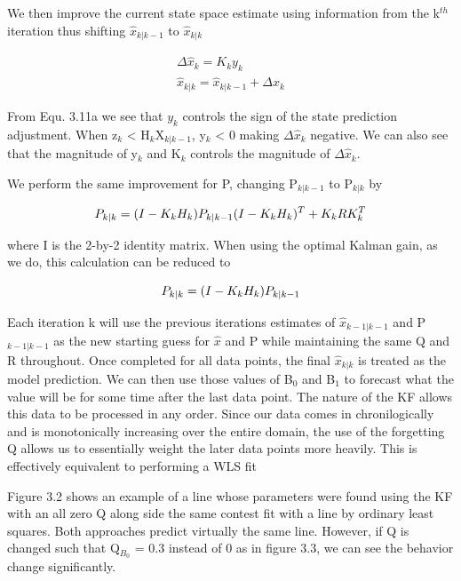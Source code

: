   We then improve the current state space estimate using information from the k$^{th}$ iteration thus shifting $\hat{x}_{k|k-1}$ to $\hat{x}_{k|k}$
  
      \begin{subequations}
      \begin{align}
    \Delta\hat{x}_{k} = K_{k}y_{k} \\
    \hat{x}_{k|k} = \hat{x}_{k|k-1} + \Delta\hat{x}_{k}
    \end{align}
  \end{subequations}

From Equ. 3.11a we see that $y_{k}$ controls the sign of the state prediction adjustment. When z$_{k}$ < H$_{k}$X$_{k|k-1}$, y$_{k}$ < 0 making $\Delta\hat{x}_{k}$ negative. We can also see that the magnitude of y$_{k}$ and K$_{k}$ controls the magnitude of $\Delta\hat{x}_{k}$.

We perform the same improvement for P, changing P$_{k|k-1}$ to P$_{k|k}$ by

\begin{equation} 
\centering
P_{k|k} = (I - K_{k}H_{k})P_{k|k-1}(I - K_{k}H_{k})^{T} + K_{k}RK_{k}^{T}
\end{equation}

where I is the 2-by-2 identity matrix. When using the optimal Kalman gain, as we do, this calculation can be reduced to 

\begin{equation} 
\centering
P_{k|k} = (I - K_{k}H_{k})P_{k|k-1}
\end{equation}

Each iteration k will use the previous iterations estimates of $\hat{x}_{k-1|k-1}$ and P$_{k-1|k-1}$ as the new starting guess for $\hat{x}$ and P while maintaining the same Q and R throughout. Once completed for all data points, the final $\hat{x}_{k|k}$ is treated as the model prediction. We can then use those values of B$_{0}$ and B$_{1}$ to forecast what the value will be for some time after the last data point. The nature of the KF allows this data to be processed in any order. Since our data comes in chronilogically and is monotonically increasing over the entire domain, the use of the forgetting Q allows us to essentially weight the later data points more heavily. This is effectively equivalent to performing a WLS fit

Figure 3.2 shows an example of a line whose parameters were found using the KF with an all zero Q along side the same contest fit with a line by ordinary least squares. Both approaches predict virtually the same line. However, if Q is changed such that Q$_{B_{0}}$ = 0.3  instead of 0 as in figure 3.3, we can see the behavior change significantly.

